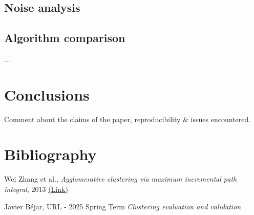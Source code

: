 \documentclass[
	10pt,
	parskip=half-,	
	paper=a4,
	english
	]{scrartcl}
\begin{document}
\subsection{Noise analysis}

\subsection{Algorithm comparison}

...

\section{Conclusions}

Comment about the claims of the paper, reproducibility \& issues encountered.

\newpage
\section{Bibliography}

\renewcommand{\section}[2]{}%
\begin{thebibliography}{9}

Wei Zhang et al.,
\textit{Agglomerative clustering via maximum incremental path integral}, 2013
\href{https://www.sciencedirect.com/science/article/pii/S0031320313001830}{(Link)}

Javier Béjar,
URL - 2025 Spring Term
\textit{Clustering evaluation and validation}

\end{thebibliography}
\end{document}
